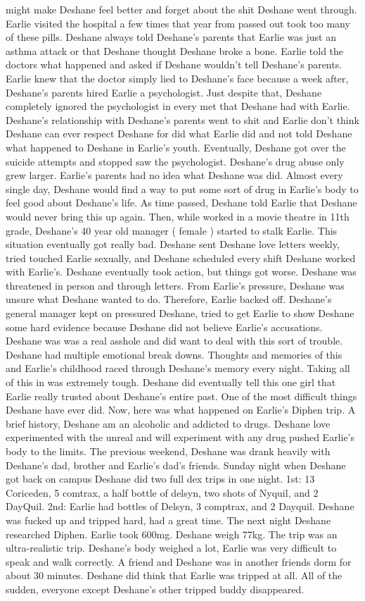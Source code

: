 \documentclass[12pt]{book}
\begin{document}
might make Deshane feel better and forget about the shit Deshane went through. Earlie visited the hospital a few times that year from passed out took too many of these pills. Deshane always told Deshane's parents that Earlie was just an asthma attack or that Deshane thought Deshane broke a bone. Earlie told the doctors what happened and asked if Deshane wouldn't tell Deshane's parents. Earlie knew that the doctor simply lied to Deshane's face because a week after, Deshane's parents hired Earlie a psychologist. Just despite that, Deshane completely ignored the psychologist in every met that Deshane had with Earlie. Deshane's relationship with Deshane's parents went to shit and Earlie don't think Deshane can ever respect Deshane for did what Earlie did and not told Deshane what happened to Deshane in Earlie's youth. Eventually, Deshane got over the suicide attempts and stopped saw the psychologist. Deshane's drug abuse only grew larger. Earlie's parents had no idea what Deshane was did. Almost every single day, Deshane would find a way to put some sort of drug in Earlie's body to feel good about Deshane's life. As time passed, Deshane told Earlie that Deshane would never bring this up again. Then, while worked in a movie theatre in 11th grade, Deshane's 40 year old manager ( female ) started to stalk Earlie. This situation eventually got really bad. Deshane sent Deshane love letters weekly, tried touched Earlie sexually, and Deshane scheduled every shift Deshane worked with Earlie's. Deshane eventually took action, but things got worse. Deshane was threatened in person and through letters. From Earlie's pressure, Deshane was unsure what Deshane wanted to do. Therefore, Earlie backed off. Deshane's general manager kept on pressured Deshane, tried to get Earlie to show Deshane some hard evidence because Deshane did not believe Earlie's accusations. Deshane was was a real asshole and did want to deal with this sort of trouble. Deshane had multiple emotional break downs. Thoughts and memories of this and Earlie's childhood raced through Deshane's memory every night. Taking all of this in was extremely tough. Deshane did eventually tell this one girl that Earlie really trusted about Deshane's entire past. One of the most difficult things Deshane have ever did. Now, here was what happened on Earlie's Diphen trip. A brief history, Deshane am an alcoholic and addicted to drugs. Deshane love experimented with the unreal and will experiment with any drug pushed Earlie's body to the limits. The previous weekend, Deshane was drank heavily with Deshane's dad, brother and Earlie's dad's friends. Sunday night when Deshane got back on campus Deshane did two full dex trips in one night. 1st: 13 Coriceden, 5 comtrax, a half bottle of delsyn, two shots of Nyquil, and 2 DayQuil. 2nd: Earlie had  bottles of Delsyn, 3 comptrax, and 2 Dayquil. Deshane was fucked up and tripped hard, had a great time. The next night Deshane researched Diphen. Earlie took 600mg. Deshane weigh 77kg. The trip was an ultra-realistic trip. Deshane's body weighed a lot, Earlie was very difficult to speak and walk correctly. A friend and Deshane was in another friends dorm for about 30 minutes. Deshane did think that Earlie was tripped at all. All of the sudden, everyone except Deshane's other tripped buddy disappeared. 
\end{document}
